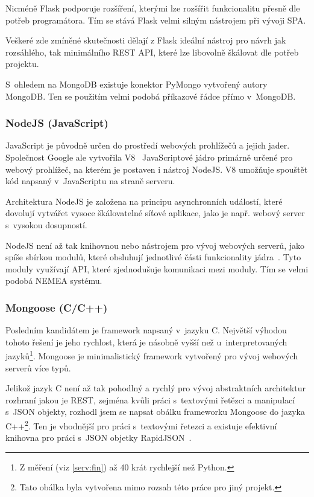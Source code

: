 Nicméně Flask podporuje rozšíření, kterými lze rozšířit funkcionalitu přesně dle potřeb programátora. Tím se stává Flask velmi silným nástrojem při vývoji SPA.

Veškeré zde zmíněné skutečnosti dělají z Flask ideální nástroj pro návrh jak rozsáhlého, tak minimálního REST API, které lze libovolně škálovat dle potřeb projektu.

S~ohledem na MongoDB existuje konektor PyMongo vytvořený autory MongoDB. Ten se použitím velmi podobá příkazové řádce přímo v~MongoDB. 

\subsubsection*{NodeJS (JavaScript)}

JavaScript je původně určen do prostředí webových prohlížečů a jejich jader. Společnost Google ale vytvořila V8~\cite{google:v8} JavaScriptové jádro primárně určené pro webový prohlížeč, na kterém je postaven i nástroj NodeJS. V8 umožňuje spouštět kód napsaný v~JavaScriptu na straně serveru.

Architektura NodeJS je založena na principu asynchronních událostí, které dovolují vytvářet vysoce škálovatelné síťové aplikace, jako je např. webový server s~vysokou dosupností.

NodeJS není až tak knihovnou nebo nástrojem pro vývoj webových serverů, jako spíše sbírkou modulů, které obsluhují jednotlivé části funkcionality jádra~\cite{nodejs}. Tyto moduly využívají API, které zjednodušuje komunikaci mezi moduly. Tím se velmi podobá NEMEA systému.

\subsubsection*{Mongoose (C/C++)}

Posledním kandidátem je framework napsaný v~jazyku C. Největší výhodou tohoto řešení je jeho rychlost, která je násobně vyšší než u~interpretovaných jazyků\footnote{Z měření (viz \ref{serv:fin}) až 40 krát rychlejší než Python.}. Mongoose je minimalistický framework vytvořený pro vývoj webových serverů více typů.

Jelikož jazyk C není až tak pohodlný a rychlý pro vývoj abstraktních architektur rozhraní jakou je REST, zejména kvůli práci s~textovými řetězci a manipulací s~JSON objekty, rozhodl jsem se napsat obálku frameworku Mongoose do jazyka C++\footnote{Tato obálka byla vytvořena mimo rozsah této práce pro jiný projekt.}. Ten je vhodnější pro práci s~textovými řetezci a existuje efektivní knihovna pro práci s~JSON objetky RapidJSON~\cite{js:rjson}.

